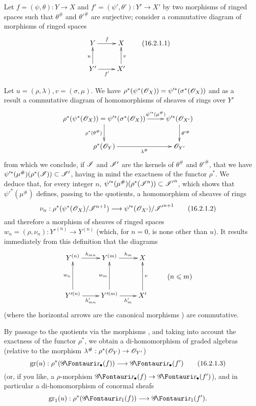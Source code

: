 \begin{env}[16.2.1]
\label{IV.16.2.1}
Let $f = (\psi, \theta): Y \to X$ and $f' = (\psi', \theta'): Y' \to X'$ by two morphisms of ringed spaces such that $\theta^\#$ and $\theta'^\#$ are surjective;
consider a commutative diagram of morphisms of ringed spaces
\[
  \label{IV.16.2.1.1}
  \xymatrix{
    Y \ar[r]^f & X \\
    Y'\ar[r]_{f'} \ar[u]^u & X'\ar[u]_v  
  }
  \tag{16.2.1.1}
\]

Let $u = (\rho, \lambda), v = (\sigma, \mu)$. 
We have $\rho^*(\psi^*(\mathscr{O}_X)) = \psi'^*(\sigma^*(\mathscr{O}_X))$ and as a result a commutative diagram of homomorphisms of sheaves of rings over $Y'$
\[
  \xymatrix{
    \rho^*(\psi^*(\sh{O}_X)) = \psi'^*(\sigma^*(\sh{O}_X)) \ar[r]^-{\psi'^*(\mu^\#)}\ar[d]_{\rho^*(\theta^\#)} & \psi'^*(\sh{O}_{X'}) \ar[d]^{\theta'^\#} \\
    \rho^*(\sh{O}_Y)\ar[r]_-{\lambda^\#}  & \sh{O}_{Y'}  
  }
\]
from which we conclude, if $\mathscr{I}$ and $\mathscr{I'}$ are the kernels of $\theta^\#$ and $\theta'^\#$, that we have $\psi'^*(\mu^\#)(\rho^*(\mathscr{I})) \subset \mathscr{I'}$, having in mind the exactness of the functor $\rho^*$.
We deduce that, for every integer $n$, $\psi'^*(\mu^\#)(\rho^*(\mathscr{I}^n)) \subset \mathscr{I'}^n$, which shows that $\psi'^*(\mu^\#)$ defines, passing to the quotients, a homomorphism of sheaves of rings
\[
  \label{IV.16.2.1.2}
  \nu_n: \rho^*(\psi^*(\sh{O}_X)/\sh{I}^{n+1}) \to \psi'^*(\sh{O}_{X'})/\sh{I'}^{n+1}
  \tag{16.2.1.2}
\]
and therefore a morphism of sheaves of ringed spaces $w_n = (\rho, \nu_n): Y'^{(n)} \to Y^{(n)}$ (which, for $n = 0$, is none other than $u$).
It results immediately from this definition that the diagrams
\[
  \xymatrix@R=1pc{
    Y^{(n)} \ar[r]^-{h_{mn}} & Y^{(m)} \ar[r]^-{h_m} & X \\
    & & & (n \leq m) \\
    Y'^{(n)} \ar[r]_-{h'_{mn}} \ar[uu]^-{w_n} & Y'^{(m)} \ar[r]_-{h'_m} \ar[uu]^-{w_m} & X' \ar[uu]_-v \\
  }
\]
(where the horizontal arrows are the canonical morphisms ) are commutative.

By passage to the quotients via the morphisms , and taking into
account the exactness of the functor $\rho^*$, we obtain a di-homomorphism of graded algebras (relative to the morphism $\lambda^\#: \rho^*(\sh{O}_Y) \to \sh{O}_{Y'}$)
\[
  \label{IV.16.2.1.3}
  \gr(u): \rho^*(\shGr_\bullet(f)) \to \shGr_\bullet(f')
  \tag{16.2.1.3}
\]
(or, if you like, a $\rho$-morphism  $\shGr_\bullet(f) \to \shGr_\bullet(f')$), and in particular a di-homomorphism of conormal sheafs
\[
  \gr_1(u): \rho^*(\shGr_1(f)) \to \shGr_1(f').
\]


\end{env}
